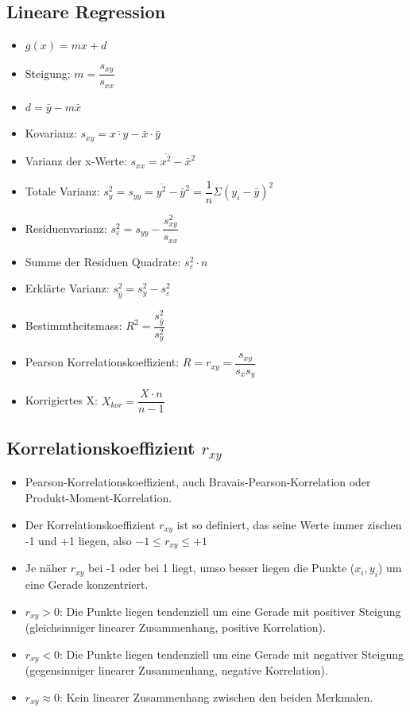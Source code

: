 \documentclass[8pt,a4paper]{scrartcl}
\begin{document}
\begin{multicols*}{3}
			\subsection{Lineare Regression}
				\begin{itemize}\itemsep0pt				
					\item $g(x) = mx + d$
					\item Steigung: $m = \dfrac{s_{xy}}{s_{xx}}$
					\item $d = \bar{y} - m\bar{x}$
					\item Kovarianz: $s_{xy} = \overline{x \cdot y} - \bar{x} \cdot \bar{y}$
					\item Varianz der x-Werte: $s_{xx} = \overline{x^{2}} - \bar{x}^{2}$
					\item Totale Varianz: $s_{y}^{2}=s_{yy} = \overline{y^{2}} - \bar{y}^{2}=  \dfrac{1}{n}\Sigma(y_{i}-\bar{y})^{2}$
					\item Residuenvarianz: $s_{\varepsilon}^{2} = s_{yy}-\dfrac{s_{xy}^{2}}{s_{xx}}$
					\item Summe der Residuen Quadrate: $s_{\varepsilon}^{2}\cdot n$
					\item Erklärte Varianz: $s_{\hat{y}}^{2}=s_{y}^{2}-s_{\varepsilon}^{2} $
					\item Bestimmtheitsmass: $R^{2}=\dfrac{s_{\hat{y}}^{2}}{s_{y}^{2}}$
					\item Pearson Korrelationskoeffizient: $R=r_{xy}=\dfrac{s_{xy}}{s_{x}s_{y}}$
					\item Korrigiertes X: $X_{kor} = \dfrac{X\cdot n}{n-1}$
				\end{itemize}
				
			\subsection{Korrelationskoeffizient $r_{xy}$}		
				\begin{itemize}\itemsep0pt				
					\item Pearson-Korrelationskoeffizient, auch Bravais-Pearson-Korrelation oder Produkt-Moment-Korrelation.
					\item Der Korrelationskoeffizient $r_{xy}$ ist so definiert, das seine Werte immer zischen -1 und +1 liegen, also $-1 \leq r_{xy} \leq +1$
					\item Je näher $r_{xy}$ bei -1 oder bei 1 liegt, umso besser liegen die Punkte ($x_{i}, y_{i}$) um eine Gerade konzentriert.
					\item $r_{xy} > 0$: Die Punkte liegen tendenziell um eine Gerade mit positiver Steigung (gleichsinniger linearer Zusammenhang, positive Korrelation).
					\item $r_{xy} < 0$: Die Punkte liegen tendenziell um eine Gerade mit negativer Steigung (gegensinniger linearer Zusammenhang, negative Korrelation).
					\item $r_{xy} \approx 0$: Kein linearer Zusammenhang zwischen den beiden Merkmalen.
				\end{itemize}				
				

\end{multicols*}
\end{document}
